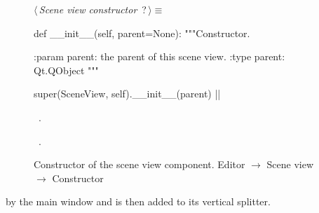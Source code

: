 \documentclass[%
    a4paper,    %
    justified,  %
    nobib,      %
    openany     %
]{tufte-book}
\begin{document}
\begin{figure}
\begin{flushleft} \small
\begin{minipage}{\linewidth}\label{scrap82}\raggedright\small
{} $\langle\,${\itshape Scene view constructor}\nobreak\ {\footnotesize {?}}$\,\rangle\equiv$
\vspace{-1ex}
\begin{pythoncode}
def __init__(self, parent=None):
    """Constructor.

    :param parent: the parent of this scene view.
    :type parent: Qt.QObject
    """

    super(SceneView, self).__init__(parent)
|\NWsep|
\end{pythoncode}
\vspace{1.5ex}
\footnotesize
\begin{list}{}{\setlength{\itemsep}{-\parsep}\setlength{\itemindent}{-\leftmargin}}
\item \NWtxtMacroDefBy\ .
\item \NWtxtMacroRefIn\ .

\item{}
\end{list}
\end{minipage}\vspace{4ex}
\end{flushleft}
\caption{Constructor of the scene view component.
  \newline{}\newline{}Editor $\rightarrow$ Scene view $\rightarrow$ Constructor}
\label{editor:lst:scene-view:constructor}
\end{figure}

 by the main window and is then added to its
vertical splitter.
\end{document}

